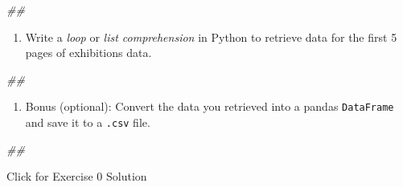 \documentclass[
]{book}
\newenvironment{Shaded}{\begin{snugshade}}{\end{snugshade}}
\newcommand{\CommentTok}[1]{\textcolor[rgb]{0.56,0.35,0.01}{\textit{#1}}}
\providecommand{\tightlist}{%
  \setlength{\itemsep}{0pt}\setlength{\parskip}{0pt}}
\begin{document}
\begin{Shaded}
\begin{Highlighting}[]
\CommentTok{\#\#}
\end{Highlighting}
\end{Shaded}

\begin{enumerate}
\def\labelenumi{\arabic{enumi}.}
\setcounter{enumi}{2}
\tightlist
\item
  Write a \emph{loop} or \emph{list comprehension} in Python to retrieve data
  for the first 5 pages of exhibitions data.
\end{enumerate}

\begin{Shaded}
\begin{Highlighting}[]
\CommentTok{\#\#}
\end{Highlighting}
\end{Shaded}

\begin{enumerate}
\def\labelenumi{\arabic{enumi}.}
\setcounter{enumi}{3}
\tightlist
\item
  Bonus (optional): Convert the data you retrieved into a pandas
  \texttt{DataFrame} and save it to a \texttt{.csv} file.
\end{enumerate}

\begin{Shaded}
\begin{Highlighting}[]
\CommentTok{\#\#}
\end{Highlighting}
\end{Shaded}

{Click for Exercise 0 Solution}
\end{document}
